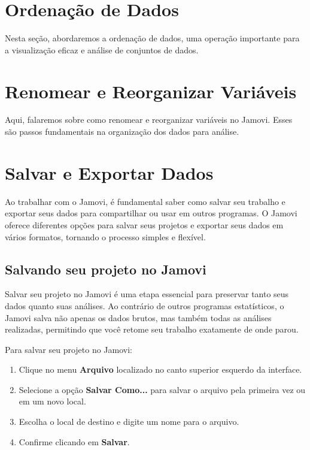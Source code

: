 \section{Ordenação de Dados}
Nesta seção, abordaremos a ordenação de dados, uma operação importante para a visualização eficaz e análise de conjuntos de dados.

\section{Renomear e Reorganizar Variáveis}
Aqui, falaremos sobre como renomear e reorganizar variáveis no Jamovi. Esses são passos fundamentais na organização dos dados para análise.

\section{Salvar e Exportar Dados}

Ao trabalhar com o Jamovi, é fundamental saber como salvar seu trabalho e exportar seus dados para compartilhar ou usar em outros programas. O Jamovi oferece diferentes opções para salvar seus projetos e exportar seus dados em vários formatos, tornando o processo simples e flexível.

\subsection{Salvando seu projeto no Jamovi}

Salvar seu projeto no Jamovi é uma etapa essencial para preservar tanto seus dados quanto suas análises. Ao contrário de outros programas estatísticos, o Jamovi salva não apenas os dados brutos, mas também todas as análises realizadas, permitindo que você retome seu trabalho exatamente de onde parou.

Para salvar seu projeto no Jamovi:

\begin{enumerate}
    \item Clique no menu \textbf{Arquivo} localizado no canto superior esquerdo da interface.
    \item Selecione a opção \textbf{Salvar Como...} para salvar o arquivo pela primeira vez ou em um novo local.
    \item Escolha o local de destino e digite um nome para o arquivo.
    \item Confirme clicando em \textbf{Salvar}.
\end{enumerate}

